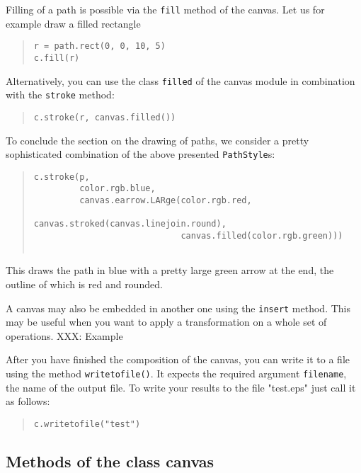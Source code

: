 Filling of a path is possible via the \verb|fill| method of the canvas.
Let us for example draw a filled rectangle 
\begin{quote}
\begin{verbatim}
r = path.rect(0, 0, 10, 5)
c.fill(r)
\end{verbatim}
\end{quote}
Alternatively, you can use the class \verb|filled| of the canvas module
in combination with the \verb|stroke| method:
\begin{quote}
\begin{verbatim}
c.stroke(r, canvas.filled())
\end{verbatim}
\end{quote}

To conclude the section on the drawing of paths, we consider a pretty
sophisticated combination of the above presented \verb|PathStyle|s:
\begin{quote}
\begin{verbatim}
c.stroke(p, 
         color.rgb.blue, 
         canvas.earrow.LARge(color.rgb.red,
                             canvas.stroked(canvas.linejoin.round),
                             canvas.filled(color.rgb.green)))
                                                              
\end{verbatim}
\end{quote}
This draws the path in blue with a pretty large green arrow at the
end, the outline of which is red and rounded.

A canvas may also be embedded in another one using the \texttt{insert}
method. This may be useful when you want to apply a transformation on
a whole set of operations. XXX: Example

After you have finished the composition of the canvas, you can
write it to a file using the method \verb|writetofile()|. It expects the
required argument \verb|filename|, the name of the output
file. To write your results to the file "test.eps" just call it as follows:
\begin{quote}
\begin{verbatim}
c.writetofile("test")
\end{verbatim}
\end{quote}


\subsection{Methods of the class canvas}

